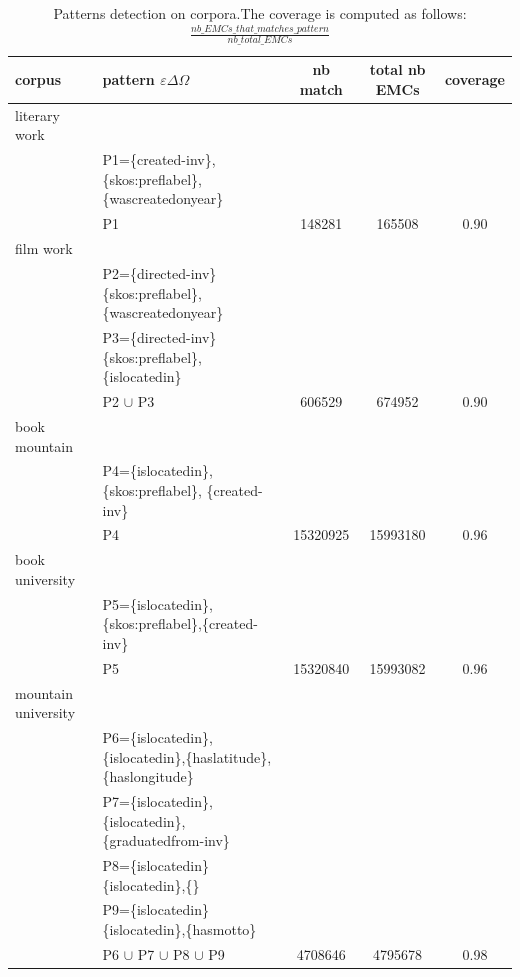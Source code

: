\documentclass[runningheads]{llncs}
\begin{document}
\begin{table}[]
    \centering
    \begin{tabular}{l|l|c|c|c}
        \hline
         corpus & pattern $\varepsilon\Delta\Omega$ & nb match & total nb EMCs & coverage   \\
         \hline
       literary work  & & & & \\
         & P1=\{created-inv\},\{skos:preflabel\},\{wascreatedonyear\}& & & \\
       \hline  
       & P1 & 148281 & 165508 & 0.90\\
       \hline
       film work & & & & \\  
       & P2=\{directed-inv\}\{skos:preflabel\},\{wascreatedonyear\} & & & \\
       & P3=\{directed-inv\}\{skos:preflabel\},\{islocatedin\} & & & \\
       \hline
        & P2 $\cup$ P3 & 606529 & 674952 & 0.90\\
       \hline
       \hline
       book mountain & & & & \\  
       & P4=\{islocatedin\},\{skos:preflabel\}, \{created-inv\}& & & \\
       \hline
       & P4 & 15320925 & 15993180 & 0.96\\
       \hline
       book university & & & &  \\
       & P5=\{islocatedin\},\{skos:preflabel\},\{created-inv\}& & & \\
       \hline
       & P5 & 15320840 & 15993082 & 0.96 \\
       \hline
       mountain university  & & & & \\
       & P6=\{islocatedin\},\{islocatedin\},\{haslatitude\}, \{haslongitude\}& & & \\
       &P7=\{islocatedin\},\{islocatedin\},\{graduatedfrom-inv\}& & & \\
       &P8=\{islocatedin\}\{islocatedin\},\{\}& & & \\
       &P9=\{islocatedin\}\{islocatedin\},\{hasmotto\}& & & \\
       \hline
       &P6 $\cup$ P7 $\cup$ P8 $\cup$ P9 & 4708646 & 4795678& 0.98\\
       \hline
    \end{tabular}
    \caption{Patterns detection on corpora.The coverage is computed as follows: $\frac{nb\_EMCs\_that\_matches\_pattern}{nb\_total\_ EMCs}$}
    \label{tab:pattern_detection}
\end{table}
\end{document}
